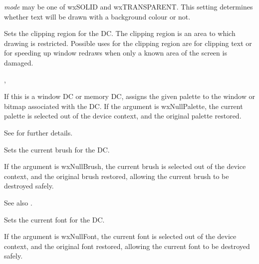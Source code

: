 {\it mode} may be one of wxSOLID and wxTRANSPARENT. This setting determines
whether text will be drawn with a background colour or not.

\label{wxdcsetclippingregion}



Sets the clipping region for the DC. The clipping region is an area
to which drawing is restricted. Possible uses for the clipping region are for clipping text
or for speeding up window redraws when only a known area of the screen is damaged.


, 

\label{wxdcsetpalette}


If this is a window DC or memory DC, assigns the given palette to the window
or bitmap associated with the DC. If the argument is wxNullPalette, the current
palette is selected out of the device context, and the original palette
restored.

See  for further details.

\label{wxdcsetbrush}


Sets the current brush for the DC.

If the argument is wxNullBrush, the current brush is selected out of the device
context, and the original brush restored, allowing the current brush to
be destroyed safely.

See also .

\label{wxdcsetfont}


Sets the current font for the DC.

If the argument is wxNullFont, the current font is selected out of the device
context, and the original font restored, allowing the current font to
be destroyed safely.

